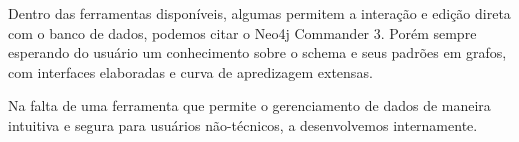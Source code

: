 Dentro das ferramentas disponíveis, algumas permitem a interação e edição direta com o banco de dados, podemos citar o Neo4j Commander 3. Porém sempre esperando do usuário um conhecimento sobre o schema e seus padrões em grafos, com interfaces elaboradas e curva de apredizagem extensas.

Na falta de uma ferramenta que permite o gerenciamento de dados de maneira intuitiva e segura para usuários não-técnicos, a desenvolvemos internamente.
